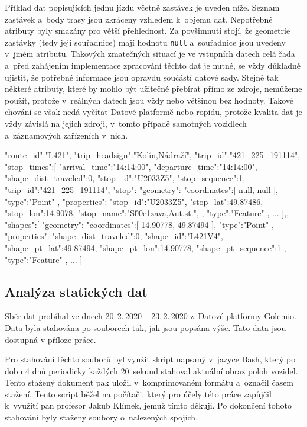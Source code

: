 \bigbreak

Příklad dat popisujících jednu jízdu včetně zastávek je uveden níže. Seznam zastávek a~body trasy jsou zkráceny vzhledem k~objemu dat. Nepotřebné atributy byly smazány pro větší přehlednost. Za povšimnutí stojí, že geometrie zastávky (tedy její souřadnice) mají hodnotu \verb-null- a~souřadnice jsou uvedeny v~jiném atributu. Takových zmatečných situací je ve vstupních datech celá řada a~před zahájením implementace zpracování těchto dat je nutné, se vždy důkladně ujistit, že potřebné informace jsou opravdu součástí datové sady. Stejně tak některé atributy, které by mohlo být užitečné přebírat přímo ze zdroje, nemůžeme použít, protože v~reálných datech jsou vždy nebo většinou bez hodnoty. Takové chování se však nedá vyčítat Datové platformě nebo \gls{ropid}u, protože kvalita dat je vždy závislá na jejich zdroji, v~tomto případě samotných vozidlech a~záznamových zařízeních v~nich.

\begin{code}[frame=none]
"route_id":"L421",
"trip_headsign":"Kolín,Nádraží",
"trip_id":"421_225_191114",
"stop_times":[{
  "arrival_time":"14:14:00",
  "departure_time":"14:14:00",
  "shape_dist_traveled":0,
  "stop_id":"U2033Z5",
  "stop_sequence":1,
  "trip_id":"421_225_191114",
  "stop":{
    "geometry":{
      "coordinates":[
        null,
        null
      ],
      "type":"Point"
    },
    "properties":{
      "stop_id":"U2033Z5",
      "stop_lat":49.87486,
      "stop_lon":14.9078,
      "stop_name":"S\u00e1zava,Aut.st.",
    },
    "type":"Feature"
  },
  ...
],},
"shapes":[{
  "geometry":{
    "coordinates":[
      14.90778,
      49.87494
    ],
    "type":"Point"
  },
  "properties":{
    "shape_dist_traveled":0,
    "shape_id":"L421V4",
    "shape_pt_lat":49.87494,
    "shape_pt_lon":14.90778,
    "shape_pt_sequence":1
  },
  "type":"Feature"
},
...
]

\end{code}

\subsection{Analýza statických dat}

Sběr dat probíhal ve dnech 20.\,2.\,2020 -- 23.\,2.\,2020 z~Datové platformy Golemio. Data byla stahována po souborech tak, jak jsou popsána výše. Tato data jsou dostupná v příloze práce.

\bigbreak

Pro stahování těchto souborů byl využit skript napsaný v~jazyce Bash, který po dobu 4 dnů periodicky každých 20~sekund stahoval aktuální obraz poloh vozidel. Tento stažený dokument pak uložil v~komprimovaném formátu a~označil časem stažení. Tento script běžel na počítači, který pro účely této práce zapůjčil k~využití pan profesor Jakub Klímek, jemuž tímto děkuji. Po dokončení tohoto stahování byly staženy soubory o~nalezených spojích.

